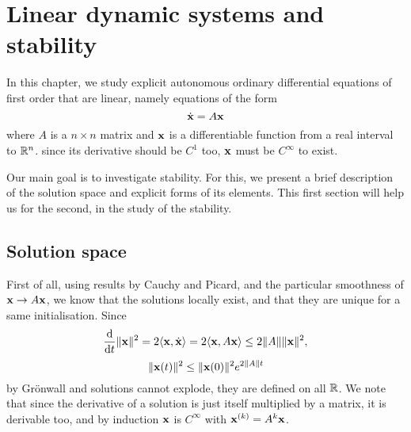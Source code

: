 \chapter{Linear dynamic systems and stability}
In this chapter, we study explicit autonomous ordinary differential equations of first order that are linear, namely equations of the form 
\[\dot{\mathbf{x}}=A\mathbf{x}\]
where $A$ is a $n\times n$ matrix and $\mathbf{x}$ is a differentiable function from a real interval to $\mathbb{R}^n$. since its derivative should be $C^1$ too, $\mathbf{x}$ must be $C^\infty$ to exist.

Our main goal is to investigate stability. For this, we present a brief description of the solution space and explicit forms of its elements. This first section will help us for the second, in the study of the stability.
\section{Solution space}
First of all, using results by Cauchy and Picard, and the particular smoothness of $\mathbf{x}\to A\mathbf{x}$, we know that the solutions locally exist, and that they are unique for a same initialisation. Since $$\frac{\mathrm{d}}{\mathrm{d} t}\|\mathbf{x}\|^2=2\langle\mathbf{x},\dot{\mathbf{x}}\rangle=2\langle\mathbf{x},A\mathbf{x}\rangle\leq 2\|A\|\|\mathbf{x}\|^2,$$ 
$$\|\mathbf{x}(t)\|^2\leq \|\mathbf{x}(0)\|^2e^{2\|A\|t} $$
by Grönwall and solutions cannot explode, they are defined on all $\mathbb{R}$. We note that since the derivative of a solution is just itself multiplied by a matrix, it is derivable too, and by induction $\mathbf{x}$ is $C^\infty$ with $\mathbf{x}^{(k)}=A^k\mathbf{x}$. 

